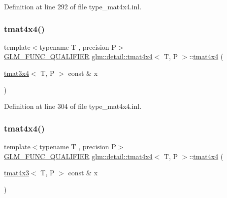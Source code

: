 Definition at line 292 of file type\+\_\+mat4x4.\+inl.

\mbox{\label{structglm_1_1detail_1_1tmat4x4_a707af64af7ea6b69ba12aa60d2cb73f8}} 
\subsubsection{\texorpdfstring{tmat4x4()}{tmat4x4()}\hspace{0.1cm}{\footnotesize\ttfamily [17/22]}}
{\footnotesize\ttfamily template$<$typename T , precision P$>$ \\
\hyperlink{setup_8hpp_a33fdea6f91c5f834105f7415e2a64407}{G\+L\+M\+\_\+\+F\+U\+N\+C\+\_\+\+Q\+U\+A\+L\+I\+F\+I\+ER} \hyperlink{structglm_1_1detail_1_1tmat4x4}{glm\+::detail\+::tmat4x4}$<$ T, P $>$\+::\hyperlink{structglm_1_1detail_1_1tmat4x4}{tmat4x4} (\begin{DoxyParamCaption}\item[{\hyperlink{structglm_1_1detail_1_1tmat3x4}{tmat3x4}$<$ T, P $>$ const \&}]{x }\end{DoxyParamCaption})\hspace{0.3cm}{\ttfamily [explicit]}}



Definition at line 304 of file type\+\_\+mat4x4.\+inl.

\mbox{\label{structglm_1_1detail_1_1tmat4x4_a1171d5bc85975c341d10e5ea766328dd}} 
\subsubsection{\texorpdfstring{tmat4x4()}{tmat4x4()}\hspace{0.1cm}{\footnotesize\ttfamily [18/22]}}
{\footnotesize\ttfamily template$<$typename T , precision P$>$ \\
\hyperlink{setup_8hpp_a33fdea6f91c5f834105f7415e2a64407}{G\+L\+M\+\_\+\+F\+U\+N\+C\+\_\+\+Q\+U\+A\+L\+I\+F\+I\+ER} \hyperlink{structglm_1_1detail_1_1tmat4x4}{glm\+::detail\+::tmat4x4}$<$ T, P $>$\+::\hyperlink{structglm_1_1detail_1_1tmat4x4}{tmat4x4} (\begin{DoxyParamCaption}\item[{\hyperlink{structglm_1_1detail_1_1tmat4x3}{tmat4x3}$<$ T, P $>$ const \&}]{x }\end{DoxyParamCaption})\hspace{0.3cm}{\ttfamily [explicit]}}



